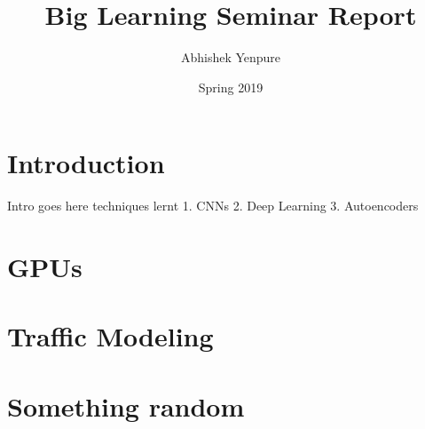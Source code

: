 \documentclass[12pt]{extarticle}
\title{Big Learning Seminar Report}
\author{Abhishek Yenpure}
\date{Spring 2019}
\begin{document}
\maketitle

\section{Introduction}

Intro goes here
techniques lernt 
1. CNNs
2. Deep Learning
3. Autoencoders

\section{GPUs}

\section{Traffic Modeling}

\section{Something random}

%
%
\end{document}
